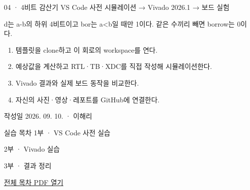 
\renewcommand{\labonehome}{\hyperlink{modern-04-contents}{\contentsbutton}}
\renewcommand{\legacySource}[1]{}
\providecommand{\terminalbox}[1]{\par\vspace{0.15cm}{\setlength{\fboxsep}{7pt}\colorbox{black}{\parbox{\dimexpr\textwidth-14pt\relax}{\color{white}\ttfamily\fontsize{7}{9}\selectfont #1}}}\par\vspace{0.15cm}}

\begingroup
\renewcommand{\small}{\fontsize{9}{11}\selectfont}
\begin{frame}{04 · 4비트 감산기}\relax
\small
VS Code 사전 시뮬레이션 → Vivado 2026.1 → 보드 실험\par\vspace{0.22cm}d는 a-b의 하위 4비트이고 bor는 a<b일 때만 1이다. 같은 수끼리 빼면 borrow는 0이다.\par\begin{enumerate}\setlength{\itemsep}{0.22cm}
\item 템플릿을 clone하고 이 회로의 workspace를 연다.
\item 예상값을 계산하고 RTL·TB·XDC를 직접 작성해 시뮬레이션한다.
\item Vivado 결과와 실제 보드 동작을 비교한다.
\item 자신의 사진·영상·레포트를 GitHub에 연결한다.
\end{enumerate}
작성일 2026. 09. 10. · 이해리\par
\end{frame}

\begin{frame}[label=modern-04-contents]{실습 목차}\relax
\small
1부 · VS Code 사전 실습\par{}\par\vspace{0.2cm}
\par\vspace{0.4cm}
2부 · Vivado 실습\par{}\par\vspace{0.4cm}
3부 · 결과 정리\par{}\par\vspace{0.35cm}
\href{04.LAB1_00_CONTENTS.pdf}{전체 목차 PDF 열기}
\end{frame}

